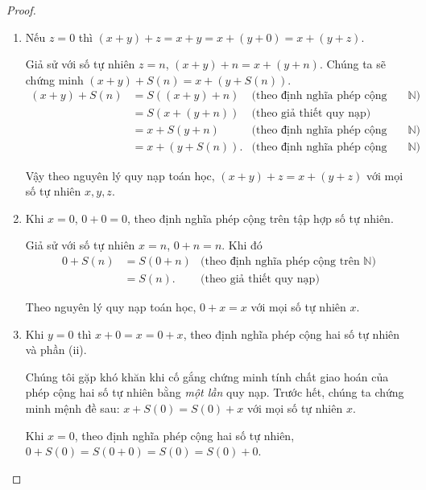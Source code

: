 \begin{proof}
    \begin{enumerate}[label={(\roman*)}]
        \item Nếu $z = 0$ thì $(x + y) + z = x + y = x + (y + 0) = x + (y + z)$.

              Giả sử với số tự nhiên $z = n$, $(x + y) + n = x + (y + n)$. Chúng ta sẽ chứng minh $(x + y) + S(n) = x + (y + S(n))$.
              \begin{align*}
                  (x + y) + S(n) & = S((x + y) + n)  & \text{(theo định nghĩa phép cộng trên $\mathbb{N}$)} \\
                                 & = S(x + (y + n))  & \text{(theo giả thiết quy nạp)}                      \\
                                 & = x + S(y + n)    & \text{(theo định nghĩa phép cộng trên $\mathbb{N}$)} \\
                                 & = x + (y + S(n)). & \text{(theo định nghĩa phép cộng trên $\mathbb{N}$)}
              \end{align*}

              Vậy theo nguyên lý quy nạp toán học, $(x + y) + z = x + (y + z)$ với mọi số tự nhiên $x, y, z$.
        \item Khi $x = 0$, $0 + 0 = 0$, theo định nghĩa phép cộng trên tập hợp số tự nhiên.

              Giả sử với số tự nhiên $x = n$, $0 + n = n$. Khi đó
              \begin{align*}
                  0 + S(n) & = S(0 + n) & \text{(theo định nghĩa phép cộng trên $\mathbb{N}$)} \\
                           & = S(n).    & \text{(theo giả thiết quy nạp)}
              \end{align*}

              Theo nguyên lý quy nạp toán học, $0 + x = x$ với mọi số tự nhiên $x$.
        \item Khi $y = 0$ thì $x + 0 = x = 0 + x$, theo định nghĩa phép cộng hai số tự nhiên và phần (ii).

              Chúng tôi gặp khó khăn khi cố gắng chứng minh tính chất giao hoán của phép cộng hai số tự nhiên bằng \textit{một lần} quy nạp. Trước hết, chúng ta chứng minh mệnh đề sau: $x + S(0) = S(0) + x$ với mọi số tự nhiên $x$.

              Khi $x = 0$, theo định nghĩa phép cộng hai số tự nhiên, $0 + S(0) = S(0 + 0) = S(0) = S(0) + 0$.


\end{enumerate}
\end{proof}
